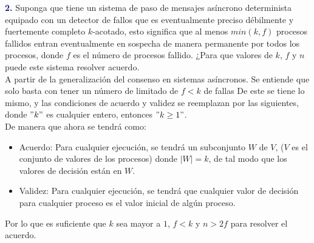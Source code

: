 \newline
\textbf{\textcolor{MidnightBlue}{2.}}
Suponga que tiene un sistema de paso de mensajes asíncrono determinista equipado
con un detector de fallos que es eventualmente preciso débilmente y fuertemente
completo $k$-acotado, esto significa que al menos $min(k,f)$ procesos fallidos entran
eventualmente en sospecha de manera permanente por todos los procesos, donde $f$ es
el número de procesos fallido. ¿Para que valores de $k$, $f$ y $n$ puede este sistema
resolver acuerdo.\\

A partir de la generalización del consenso en sistemas asíncronos.
Se entiende que solo basta con tener un número de limitado de $f<k$ de fallas
De este se tiene lo mismo, y las condiciones de acuerdo y validez se reemplazan
por las siguientes, donde $"k"$ es cualquier entero, entonces $"k\geq 1"$.\\

De manera que ahora se tendrá como:
\begin{itemize}
\item Acuerdo: Para cualquier ejecución, se tendrá un subconjunto $W$ de $V$,
($V$ es el conjunto de valores de los procesos)
donde $|W|=k$, de tal modo que los valores de decisión están en $W$.
\item Validez: Para cualquier ejecución, se tendrá que cualquier valor de decisión
para cualquier proceso es el valor inicial de algún proceso.
\end{itemize}

Por lo que es suficiente que $k$ sea mayor a $1$,  $f<k$ y $n>2f$ para resolver
el acuerdo.\\
